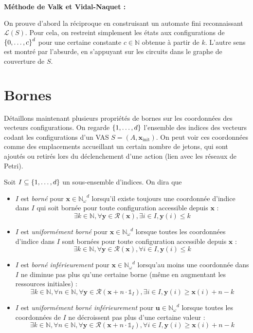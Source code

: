 \documentclass[a4paper,final]{article}
\theoremstyle{definition}
\let\leq\leqslant
\let\geq\geqslant
\newcommand{\os}[1]{\left\{\mathinner{#1}\right\}}
\newcommand{\N}{\ensuremath{\mathbb{N}}}
\newcommand{\Nomega}{\ensuremath{\mathbb{N}_\omega}}
\newcommand{\indicatrice}[1]{\ensuremath{\mathds{1}_{#1}}}
\newcommand{\lang}{\ensuremath{\mathcal{L}}}
\newcommand{\vect}[1]{\ensuremath{\mathbf{#1}}}
\newcommand{\conf}[1]{\ensuremath{\mathcal{R}(#1)}}
\newcommand{\xinit}{\ensuremath{\vect{x}_\text{init}}}
\begin{document}
\textbf{Méthode de Valk et Vidal-Naquet :}

On prouve d'abord la réciproque en construisant un automate fini reconnaissant $\lang(S)$.
Pour cela, on restreint simplement les états aux configurations de $\os{0,\dots,c}^d$ pour une certaine constante $c\in\N$ obtenue à partir de $k$.
L'autre sens est montré par l'absurde, en s'appuyant sur les circuits dans le graphe de couverture de $S$.


\section{Bornes}

Détaillons maintenant plusieurs propriétés de bornes sur les coordonnées des vecteurs configurations.
On regarde $\os{1,\dots,d}$ l'ensemble des indices des vecteurs codant les configurations d'un VAS $S=(A,\xinit)$.
On peut voir ces coordonnées comme des emplacements accueillant un certain nombre de jetons, qui sont ajoutés ou retirés lors du déclenchement d'une action (lien avec les réseaux de Petri).

Soit $I\subseteq \os{1,\dots,d}$ un sous-ensemble d'indices.
On dira que
\begin{itemize}
    \item $I$ est \emph{borné} pour $\vect{x}\in \Nomega^d$ lorsqu'il existe toujours une coordonnée d'indice dans $I$ qui soit bornée pour toute configuration accessible depuis $\vect{x}$ :
    $$\exists k\in\N, \forall \vect{y}\in\conf{\vect{x}}, \exists i\in I, \vect{y}(i)\leq k$$
    
    \item $I$ est \emph{uniformément borné} pour $\vect{x}\in \Nomega^d$ lorsque toutes les coordonnées d'indice dans $I$ sont bornées pour toute configuration accessible depuis $\vect{x}$ :
    $$\exists k\in\N, \forall \vect{y}\in\conf{\vect{x}}, \forall i\in I, \vect{y}(i)\leq k$$
    
    \item $I$ est \emph{borné inférieurement} pour $\vect{x}\in \Nomega^d$ lorsqu'au moins une coordonnée dans $I$ ne diminue pas plus qu'une certaine borne (même en augmentant les ressources initiales) :
    $$\exists k\in\N, \forall n\in\N, \forall \vect{y}\in\conf{\vect{x} + n\cdot\indicatrice{I}}, \exists i\in I, \vect{y}(i)\geq \vect{x}(i)+n-k$$
    
    \item $I$ est \emph{uniformément borné inférieurement} pour $\vect{u}\in \Nomega^d$ lorsque toutes les coordonnées de $I$ ne décroissent pas plus d'une certaine valeur :
    $$\exists k\in\N, \forall n\in\N, \forall \vect{y}\in\conf{\vect{x} + n\cdot\indicatrice{I}}, \forall i\in I, \vect{y}(i)\geq \vect{x}(i)+n-k$$
\end{itemize}
\end{document}

